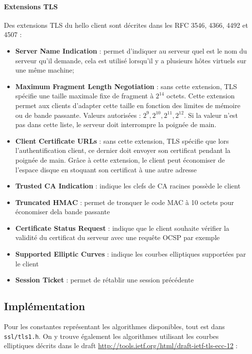 \documentclass[a4paper,11pt,french]{article}
\begin{document}
\paragraph{Extensions TLS}
Des extensions TLS du hello client sont décrites dans les RFC 3546, 4366, 4492 et 4507 :
\begin{itemize}
\item \textbf{Server Name Indication} : permet d'indiquer au serveur quel est le nom du serveur qu'il demande, cela est utilisé lorsqu'il y a plusieurs hôtes virtuels sur une même machine;
\item \textbf{Maximum Fragment Length Negotiation} : sans cette extension, TLS spécifie une taille maximale fixe de fragment à $2^{14}$ octets. Cette extension permet aux clients d'adapter cette taille en fonction des limites de mémoire ou de bande passante. Valeurs autorisées : $2^9, 2^{10}, 2^{11}, 2^{12}$. Si la valeur n'est pas dans cette liste, le serveur doit interrompre la poignée de main.
\item \textbf{Client Certificate URLs} : sans cette extension, TLS spécifie que lors l'authentification client, ce dernier doit envoyer son certificat pendant la poignée de main. Grâce à cette extension, le client peut économiser de l'espace disque en stoquant son certificat à une autre adresse
\item \textbf{Trusted CA Indication} : indique les clefs de CA racines possède le client
\item \textbf{Truncated HMAC} : permet de tronquer le code MAC à 10 octets pour économiser dela bande passante
\item \textbf{Certificate Status Request} : indique que le client souhaite vérifier la validité du certificat du serveur avec une requête OCSP par exemple
\item \textbf{Supported Elliptic Curves} : indique les courbes elliptiques supportées par le client
\item \textbf{Session Ticket} : permet de rétablir une session précédente
\end{itemize}

\subsection{Implémentation}

Pour les constantes représentant les algorithmes disponibles, tout est dans \verb+ssl/tls1.h+. On y trouve également les algorithmes utilisant les courbes elliptiques décrits dans le draft \url{http://tools.ietf.org/html/draft-ietf-tls-ecc-12} :
\end{document}
